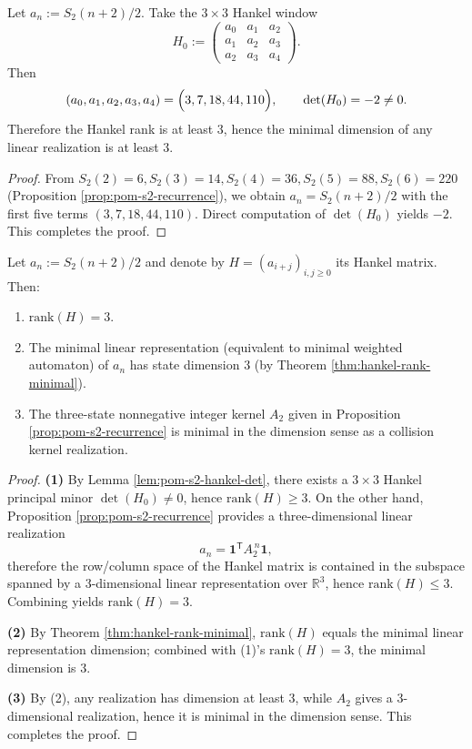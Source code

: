 \begin{lemma}\label{lem:pom-s2-hankel-det}
Let \(a_n:=S_2(n+2)/2\). Take the \(3\times 3\) Hankel window
$$
H_0:=
\begin{pmatrix}
a_0 & a_1 & a_2\\
a_1 & a_2 & a_3\\
a_2 & a_3 & a_4
\end{pmatrix}.
$$
Then
$$
(a_0,a_1,a_2,a_3,a_4)=\Bigl(3,7,18,44,110\Bigr),
\qquad
\det(H_0)=-2\neq 0.
$$
Therefore the Hankel rank is at least \(3\), hence the minimal dimension of any linear realization is at least \(3\).
\end{lemma}
\begin{proof}
From \(S_2(2)=6,S_2(3)=14,S_2(4)=36,S_2(5)=88,S_2(6)=220\) (Proposition \ref{prop:pom-s2-recurrence}), we obtain
\(
a_n=S_2(n+2)/2
\)
with the first five terms \((3,7,18,44,110)\). Direct computation of \(\det(H_0)\) yields \(-2\). This completes the proof.
\end{proof}

\begin{theorem}\label{thm:pom-s2-rank-exact}
Let \(a_n:=S_2(n+2)/2\) and denote by \(H=(a_{i+j})_{i,j\ge 0}\) its Hankel matrix. Then:
\begin{enumerate}
  \item \(\mathrm{rank}(H)=3\).
  \item The minimal linear representation (equivalent to minimal weighted automaton) of \(a_n\) has state dimension \(3\) (by Theorem \ref{thm:hankel-rank-minimal}).
  \item The three-state nonnegative integer kernel \(A_2\) given in Proposition \ref{prop:pom-s2-recurrence} is minimal in the dimension sense as a collision kernel realization.
\end{enumerate}
\end{theorem}
\begin{proof}
\textbf{(1)} By Lemma \ref{lem:pom-s2-hankel-det}, there exists a \(3\times 3\) Hankel principal minor \(\det(H_0)\neq 0\), hence \(\mathrm{rank}(H)\ge 3\).
On the other hand, Proposition \ref{prop:pom-s2-recurrence} provides a three-dimensional linear realization
$$
a_n=\mathbf{1}^{\mathsf T}A_2^{\,n}\mathbf{1},
$$
therefore the row/column space of the Hankel matrix is contained in the subspace spanned by a 3-dimensional linear representation over \(\mathbb{R}^3\), hence \(\mathrm{rank}(H)\le 3\). Combining yields \(\mathrm{rank}(H)=3\).

\textbf{(2)} By Theorem \ref{thm:hankel-rank-minimal}, \(\mathrm{rank}(H)\) equals the minimal linear representation dimension; combined with (1)'s \(\mathrm{rank}(H)=3\), the minimal dimension is \(3\).

\textbf{(3)} By (2), any realization has dimension at least 3, while \(A_2\) gives a 3-dimensional realization, hence it is minimal in the dimension sense. This completes the proof.
\end{proof}

